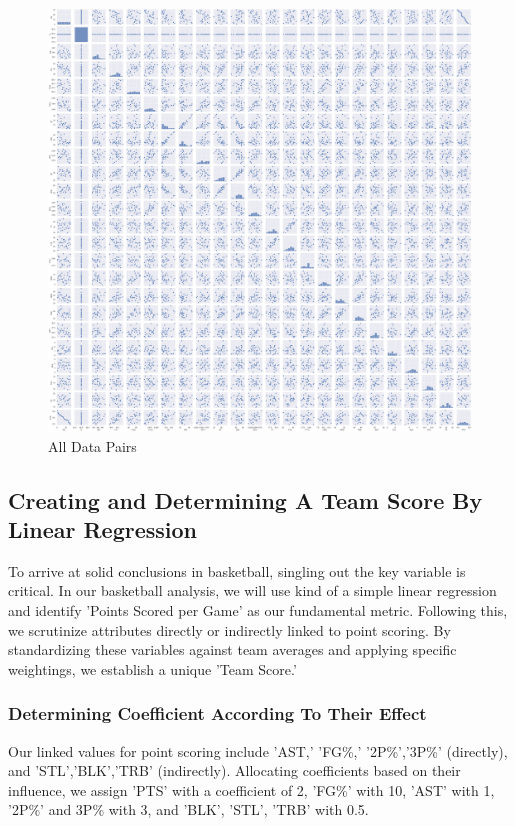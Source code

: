 \documentclass[conference]{IEEEtran}
\begin{document}
\begin{figure}[h]
    \centering
    \includegraphics[scale=0.1]{tum.png}
    \caption{All Data Pairs}
    \label{fig:enter-label}
\end{figure}

\subsection{Creating and Determining A Team Score By Linear Regression}

To arrive at solid conclusions in basketball, singling out the key variable is critical. In our basketball analysis, we will use kind of a simple linear regression and identify 'Points Scored per Game' as our fundamental metric. Following this, we scrutinize attributes directly or indirectly linked to point scoring. By standardizing these variables against team averages and applying specific weightings, we establish a unique 'Team Score.' 
\vspace{\baselineskip}
\subsubsection{Determining Coefficient According To Their Effect}

Our linked values for point scoring include ’AST,’ ’FG\%,’ ’2P\%’,’3P\%’ (directly), and ’STL’,’BLK’,’TRB’ (indirectly). Allocating coefficients based on their influence, we assign ’PTS’ with a coefficient of 2, ’FG\%’ with 10, ’AST’ with 1, ’2P\%’ and 3P\% with 3, and ’BLK’, ’STL’, ’TRB’ with 0.5.\
\vspace{\baselineskip}
\end{document}
